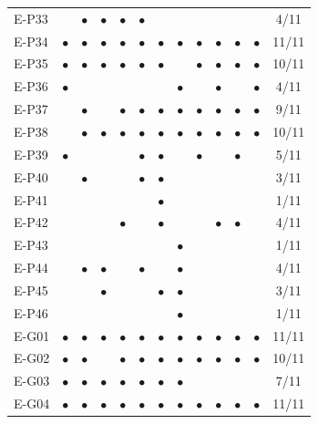 \begin{longtable}{lccccccccccc c}
    E-P33 &  & $\bullet$ & $\bullet$ & $\bullet$ & $\bullet$ &  &  &  &  &  &  & 4/11 \\
    E-P34 & $\bullet$ & $\bullet$ & $\bullet$ & $\bullet$ & $\bullet$ & $\bullet$ & $\bullet$ & $\bullet$ & $\bullet$ & $\bullet$ & $\bullet$ & 11/11 \\
    E-P35 & $\bullet$ & $\bullet$ & $\bullet$ & $\bullet$ & $\bullet$ & $\bullet$ &  & $\bullet$ & $\bullet$ & $\bullet$ & $\bullet$ & 10/11 \\
    E-P36 & $\bullet$ &  &  &  &  &  & $\bullet$ &  & $\bullet$ &  & $\bullet$ & 4/11 \\
    E-P37 &  & $\bullet$ &  & $\bullet$ & $\bullet$ & $\bullet$ & $\bullet$ & $\bullet$ & $\bullet$ & $\bullet$ & $\bullet$ & 9/11 \\
    E-P38 &  & $\bullet$ & $\bullet$ & $\bullet$ & $\bullet$ & $\bullet$ & $\bullet$ & $\bullet$ & $\bullet$ & $\bullet$ & $\bullet$ & 10/11 \\
    E-P39 & $\bullet$ &  &  &  & $\bullet$ & $\bullet$ &  & $\bullet$ &  & $\bullet$ &  & 5/11 \\
    E-P40 &  & $\bullet$ &  &  & $\bullet$ & $\bullet$ &  &  &  &  &  & 3/11 \\
    E-P41 &  &  &  &  &  & $\bullet$ &  &  &  &  &  & 1/11 \\
    E-P42 &  &  &  & $\bullet$ &  & $\bullet$ &  &  & $\bullet$ & $\bullet$ &  & 4/11 \\
    E-P43 &  &  &  &  &  &  & $\bullet$ &  &  &  &  & 1/11 \\
    E-P44 &  & $\bullet$ & $\bullet$ &  & $\bullet$ &  & $\bullet$ &  &  &  &  & 4/11 \\
    E-P45 &  &  & $\bullet$ &  &  & $\bullet$ & $\bullet$ &  &  &  &  & 3/11 \\
    E-P46 &  &  &  &  &  &  & $\bullet$ &  &  &  &  & 1/11 \\
    E-G01 & $\bullet$ & $\bullet$ & $\bullet$ & $\bullet$ & $\bullet$ & $\bullet$ & $\bullet$ & $\bullet$ & $\bullet$ & $\bullet$ & $\bullet$ & 11/11 \\
    E-G02 & $\bullet$ & $\bullet$ &  & $\bullet$ & $\bullet$ & $\bullet$ & $\bullet$ & $\bullet$ & $\bullet$ & $\bullet$ & $\bullet$ & 10/11 \\
    E-G03 & $\bullet$ & $\bullet$ & $\bullet$ & $\bullet$ & $\bullet$ & $\bullet$ & $\bullet$ &  &  &  &  & 7/11 \\
    E-G04 & $\bullet$ & $\bullet$ & $\bullet$ & $\bullet$ & $\bullet$ & $\bullet$ & $\bullet$ & $\bullet$ & $\bullet$ & $\bullet$ & $\bullet$ & 11/11 \\

\end{longtable}
